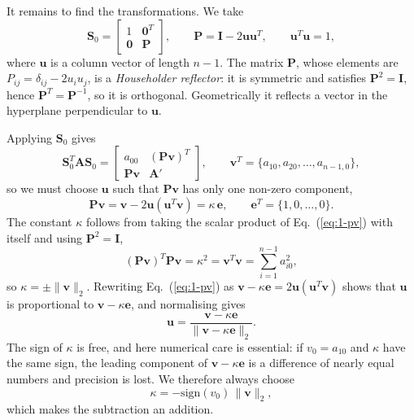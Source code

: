 It remains to find the transformations.  We take
\begin{equation}
  \bm{S}_0 =
  \begin{bmatrix} 1 & \bm{0}^{T}\\ \bm{0} & \bm{P}\end{bmatrix},
  \qquad
  \bm{P} = \bm{I} - 2\bm{u}\bm{u}^{T},
  \qquad \bm{u}^{T}\bm{u}=1,
  \label{eq:1-reflector}
\end{equation}
where $\bm{u}$ is a column vector of length $n-1$.  The matrix $\bm{P}$, whose
elements are $P_{ij}=\delta_{ij}-2u_iu_j$, is a \emph{Householder reflector}:
it is symmetric and satisfies $\bm{P}^2=\bm{I}$, hence
$\bm{P}^{T}=\bm{P}^{-1}$, so it is orthogonal.  Geometrically it reflects a
vector in the hyperplane perpendicular to $\bm{u}$.

Applying $\bm{S}_0$ gives
\begin{equation}
  \bm{S}_0^{T}\bm{A}\bm{S}_0 =
  \begin{bmatrix} a_{00} & (\bm{P}\bm{v})^{T}\\
                  \bm{P}\bm{v} & \bm{A}'\end{bmatrix},
  \qquad
  \bm{v}^{T} = \{a_{10},a_{20},\dots,a_{n-1,0}\} ,
  \label{eq:1-applyS0}
\end{equation}
so we must choose $\bm{u}$ such that $\bm{P}\bm{v}$ has only one non-zero
component,
\begin{equation}
  \bm{P}\bm{v} = \bm{v} - 2\bm{u}(\bm{u}^{T}\bm{v}) = \kappa\,\bm{e},
  \qquad \bm{e}^{T}=\{1,0,\dots,0\} .
  \label{eq:1-pv}
\end{equation}
The constant $\kappa$ follows from taking the scalar product of
Eq.~(\ref{eq:1-pv}) with itself and using $\bm{P}^2=\bm{I}$,
\begin{equation}
  (\bm{P}\bm{v})^{T}\bm{P}\bm{v} = \kappa^2 = \bm{v}^{T}\bm{v}
   = \sum_{i=1}^{n-1}a_{i0}^2 ,
  \label{eq:1-kappa}
\end{equation}
so $\kappa=\pm\|\bm{v}\|_2$.  Rewriting Eq.~(\ref{eq:1-pv}) as
$\bm{v}-\kappa\bm{e}=2\bm{u}(\bm{u}^{T}\bm{v})$ shows that $\bm{u}$ is
proportional to $\bm{v}-\kappa\bm{e}$, and normalising gives
\begin{equation}
  \bm{u} = \frac{\bm{v}-\kappa\bm{e}}{\|\bm{v}-\kappa\bm{e}\|_2} .
  \label{eq:1-uvector}
\end{equation}
The sign of $\kappa$ is free, and here numerical care is essential: if
$v_0=a_{10}$ and $\kappa$ have the same sign, the leading component of
$\bm{v}-\kappa\bm{e}$ is a difference of nearly equal numbers and precision is
lost.  We therefore always choose
\begin{equation}
  \kappa = -\mathrm{sign}(v_0)\,\|\bm{v}\|_2 ,
  \label{eq:1-kappasign}
\end{equation}
which makes the subtraction an addition.

